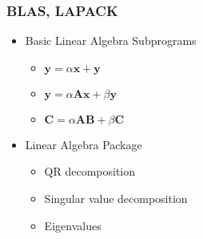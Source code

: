 \begin{frame}
\frametitle{BLAS, LAPACK}
\begin{itemize}
  \item Basic Linear Algebra Subprograms
  \begin{itemize}
    \item $\mathbf{y} = \alpha \mathbf{x}+\mathbf{y}$
    \item $\mathbf{y} = \alpha \mathbf{A}\mathbf{x}+ \beta \mathbf{y}$
    \item $\mathbf{C} = \alpha \mathbf{A}\mathbf{B}+ \beta \mathbf{C}$

  \end{itemize}
  \item Linear Algebra Package
  \begin{itemize}
    \item QR decomposition
    \item Singular value decomposition
    \item Eigenvalues
  \end{itemize}
\end{itemize}
\end{frame}
